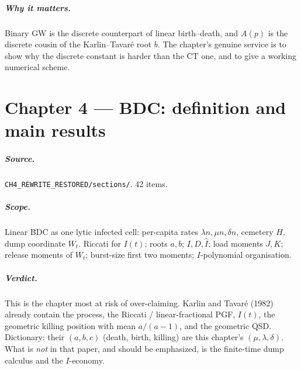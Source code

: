 \documentclass[11pt,a4paper]{report}
\newcommand{\Ifix}{\widehat{I}}
\begin{document}
\paragraph{Why it matters.}
Binary GW is the discrete counterpart of linear birth--death, and
\(A(p)\) is the discrete cousin of the Karlin--Tavar\'e root \(b\). The
chapter's genuine service is to show why the discrete constant is harder
than the CT one, and to give a working numerical scheme.

\chapter{Chapter 4 --- BDC: definition and main results}
\label{ch:4}

\paragraph{Source.} \texttt{CH4\_REWRITE\_RESTORED/sections/}. 42 items.

\paragraph{Scope.}
Linear BDC as one lytic infected cell: per-capita rates
\(\lambda n,\mu n,\delta n\), cemetery \(H\), dump coordinate \(W_t\).
Riccati for \(I(t)\); roots \(a,b\); \(I,D,\Ifix\); load moments
\(J,K\); release moments of \(W_t\); burst-size first two moments;
\(I\)-polynomial organisation.

\paragraph{Verdict.}
This is the chapter most at risk of over-claiming. Karlin and Tavar\'e
(1982) already contain the process, the Riccati / linear-fractional PGF,
\(I(t)\), the geometric killing position with mean \(a/(a-1)\), and the
geometric QSD. Dictionary: their \((a,b,c)\) (death, birth, killing) are
this chapter's \((\mu,\lambda,\delta)\). What is \emph{not} in that paper,
and should be emphasized, is the finite-time dump calculus and the
\(I\)-economy.
\end{document}
